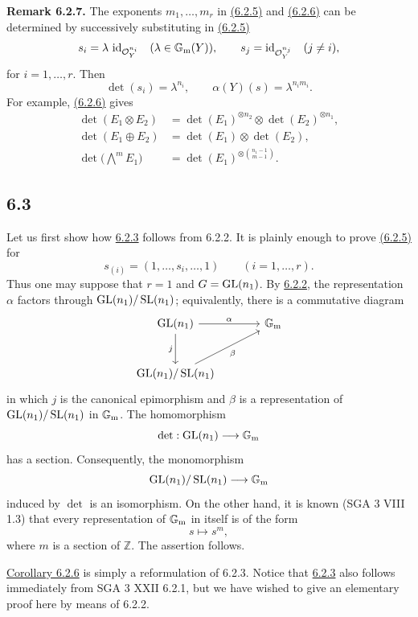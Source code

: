 \textbf{Remark 6.2.7.}
The exponents $m_1,\ldots,m_r$ in \hyperlink{sga6.e10.eq.6-2-5}{(6.2.5)} and \hyperlink{sga6.e10.eq.6-2-6}{(6.2.6)} can be determined by
successively substituting in \hyperlink{sga6.e10.eq.6-2-5}{(6.2.5)}
\[
s_i=\lambda\,\operatorname{id}_{\mathcal O_Y^{n_i}}\quad(\lambda\in\mathbb G_{\mathrm m}(Y)),
\qquad
s_j=\operatorname{id}_{\mathcal O_Y^{n_j}}\quad(j\ne i),
\]
for $i=1,\ldots,r$. Then
\[
\det(s_i)=\lambda^{n_i},
\qquad
\alpha(Y)(s)=\lambda^{n_i m_i}.
\]
For example, \hyperlink{sga6.e10.eq.6-2-6}{(6.2.6)} gives
\begin{align}
\det(E_1\otimes E_2)
&=\det(E_1)^{\otimes n_2}\otimes\det(E_2)^{\otimes n_1},
\tag{6.2.8}\\
\det(E_1\oplus E_2)
&=\det(E_1)\otimes\det(E_2),
\tag{6.2.9}\\
\det\bigl(\bigwedge\nolimits^m E_1\bigr)
&=\det(E_1)^{\otimes\binom{n_1-1}{m-1}}.
\tag{6.2.10}
\end{align}

\subsection*{6.3}
Let us first show how \hyperlink{sga6.e10.cor.6-2-3}{6.2.3} follows from 6.2.2. It is plainly enough to prove
\hyperlink{sga6.e10.eq.6-2-5}{(6.2.5)} for
\[
s_{(i)}=(1,\ldots,s_i,\ldots,1)\qquad(i=1,\ldots,r).
\]
Thus one may suppose that $r=1$ and $G=\operatorname{GL}(n_1)$. By \hyperlink{sga6.e10.prop.6-2-2}{6.2.2}, the
representation $\alpha$ factors through $\operatorname{GL}(n_1)/\operatorname{SL}(n_1)$; equivalently,
there is a commutative diagram
\[
\begin{tikzcd}[column sep=large,row sep=large]
\GL(n_1) \arrow[r,"\alpha"] \arrow[d,"j"'] & \Gm\\
\GL(n_1)/\SL(n_1) \arrow[ur,"\beta"'] &
\end{tikzcd}
\]
in which $j$ is the canonical epimorphism and $\beta$ is a representation
of $\operatorname{GL}(n_1)/\operatorname{SL}(n_1)$ in $\mathbb G_{\mathrm m}$. The homomorphism
\[
\det:\operatorname{GL}(n_1)\longrightarrow\mathbb G_{\mathrm m}
\]
has a section. Consequently, the monomorphism
\[
\operatorname{GL}(n_1)/\operatorname{SL}(n_1)\longrightarrow\mathbb G_{\mathrm m}
\]
induced by $\det$ is an isomorphism. On the other hand, it is known
(SGA 3 VIII 1.3) that every representation of $\mathbb G_{\mathrm m}$ in itself is of the
form
\[
s\longmapsto s^m,
\]
where $m$ is a section of $\mathbb Z$. The assertion follows.

\hyperlink{sga6.e10.cor.6-2-6}{Corollary 6.2.6} is simply a reformulation of 6.2.3. Notice that \hyperlink{sga6.e10.cor.6-2-3}{6.2.3} also
follows immediately from SGA 3 XXII 6.2.1, but we have wished to give an
elementary proof here by means of 6.2.2.

